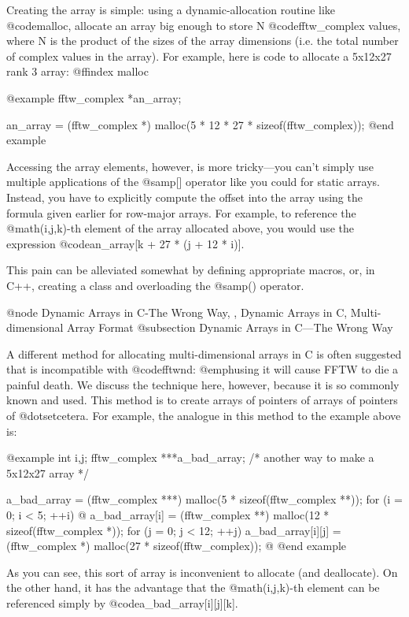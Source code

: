 Creating the array is simple: using a dynamic-allocation routine like
@code{malloc}, allocate an array big enough to store N @code{fftw_complex}
values, where N is the product of the sizes of the array dimensions
(i.e. the total number of complex values in the array).  For example,
here is code to allocate a 5x12x27 rank 3 array:
@ffindex malloc

@example
fftw_complex *an_array;

an_array = (fftw_complex *) malloc(5 * 12 * 27 * sizeof(fftw_complex));
@end example

Accessing the array elements, however, is more tricky---you can't simply
use multiple applications of the @samp{[]} operator like you could for
static arrays.  Instead, you have to explicitly compute the offset into
the array using the formula given earlier for row-major arrays.  For
example, to reference the @math{(i,j,k)}-th element of the array
allocated above, you would use the expression @code{an_array[k + 27 * (j
+ 12 * i)]}.

This pain can be alleviated somewhat by defining appropriate macros, or,
in C++, creating a class and overloading the @samp{()} operator.

@node Dynamic Arrays in C-The Wrong Way,  , Dynamic Arrays in C, Multi-dimensional Array Format
@subsection Dynamic Arrays in C---The Wrong Way

A different method for allocating multi-dimensional arrays in C is often
suggested that is incompatible with @code{fftwnd}: @emph{using it will
cause FFTW to die a painful death}.  We discuss the technique here,
however, because it is so commonly known and used.  This method is to
create arrays of pointers of arrays of pointers of @dots{}etcetera.  For
example, the analogue in this method to the example above is:

@example
int i,j;
fftw_complex ***a_bad_array;  /* another way to make a 5x12x27 array */

a_bad_array = (fftw_complex ***) malloc(5 * sizeof(fftw_complex **));
for (i = 0; i < 5; ++i) @{
     a_bad_array[i] = 
        (fftw_complex **) malloc(12 * sizeof(fftw_complex *));
     for (j = 0; j < 12; ++j)
          a_bad_array[i][j] =
                (fftw_complex *) malloc(27 * sizeof(fftw_complex));
@}
@end example

As you can see, this sort of array is inconvenient to allocate (and
deallocate).  On the other hand, it has the advantage that the
@math{(i,j,k)}-th element can be referenced simply by
@code{a_bad_array[i][j][k]}.

